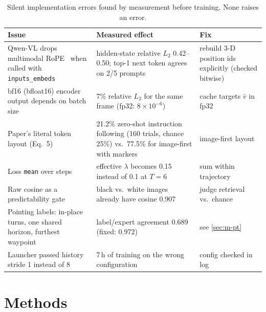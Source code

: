 \documentclass[11pt]{article}
\newcommand{\vbar}{\bar{v}}
\begin{document}
\begin{table}[t]
\centering\small
\caption{Silent implementation errors found by measurement before training. None raises an error.}
\label{tab:gotchas}
\begin{tabular}{L{4.4cm}L{6.2cm}L{3.6cm}}
\toprule
Issue & Measured effect & Fix \\
\midrule
Qwen-VL drops multimodal RoPE~\citep{su2021roformer,wang2024qwen2vl} when called with \texttt{inputs\_embeds}
  & hidden-state relative $L_2$ 0.42--0.50; top-1 next token agrees on 2/5 prompts
  & rebuild 3-D position ids explicitly (checked bitwise) \\
bf16 (bfloat16) encoder output depends on batch size & 7\% relative $L_2$ for the same frame (fp32: $8\times10^{-6}$)
  & cache targets $\vbar$ in fp32 \\
Paper's literal token layout (Eq.~5) & 21.2\% zero-shot instruction following (160 trials, chance 25\%)
  vs.\ 77.5\% for image-first with markers & image-first layout \\
Loss \texttt{mean} over steps & effective $\lambda$ becomes 0.15 instead of 0.1 at $T{=}6$ & sum within trajectory \\
Raw cosine as a predictability gate & black vs.\ white images already have cosine 0.907 & judge retrieval vs.\ chance \\
Pointing labels: in-place turns, one shared horizon, furthest waypoint
  & label/expert agreement 0.689 (fixed: 0.972) & see \cref{sec:m-pt} \\
Launcher passed history stride 1 instead of 8 & 7\,h of training on the wrong configuration & config checked in log \\
\bottomrule
\end{tabular}
\end{table}

\section{Methods}
\end{document}
